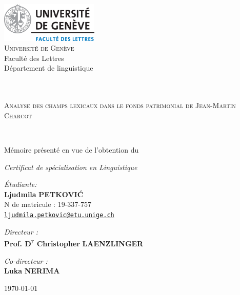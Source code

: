 \begin{titlepage}
\begin{center}

\includegraphics[width=0.35\textwidth]{img/unige_lettres_logo.png}~\\[1cm]

\large \textsc{Université de Genève}\\Faculté des Lettres\\
Département de linguistique

\textsc{\Large }\\[0.5cm]

\HRule \\[0.3cm]

{\LARGE \textsc{Analyse des champs lexicaux dans le fonds patrimonial de Jean-Martin Charcot} \\[0.4cm] }

\HRule \\[1.4cm]
\normalsize{Mémoire présenté en vue de l'obtention du\medskip

\large \textit{Certificat de spécialisation en Linguistique}\vspace{2cm}}

\begin{minipage}{1\textwidth}
\begin{flushleft} \normalsize
\emph{Étudiante:}\\
\textbf{Ljudmila} \textsc{\textbf{PETKOVI\'C}}\\
\small{N\textdegree{} de matricule : 19-337-757\\\href{mailto:ljudmila.petkovic@etu.unige.ch}{\texttt{ljudmila.petkovic@etu.unige.ch}}}
\end{flushleft}
\end{minipage}
\begin{minipage}{1\textwidth}
\begin{flushright} \normalsize
\emph{Directeur :} \\
\textbf{Prof. D\textsuperscript{r} Christopher} \textsc{\textbf{LAENZLINGER}}

\medskip
\emph{Co-directeur :} \\
\textbf{Luka} \textsc{\textbf{NERIMA}}
\end{flushright}
\end{minipage}

\vfill

{\normalsize \today}

\end{center}
\end{titlepage}